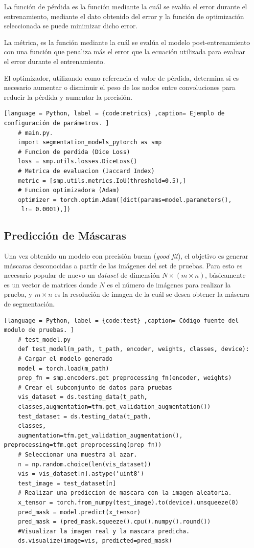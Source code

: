 La función de pérdida es la función mediante la cuál se evalúa el error durante el entrenamiento, mediante el dato obtenido del error y la función de optimización seleccionada se puede minimizar dicho error.

La métrica, es la función mediante la cuál se evalúa el modelo post-entrenamiento con una función que penaliza más el error que la ecuación utilizada para evaluar el error durante el entrenamiento.

El optimizador, utilizando como referencia el valor de pérdida, determina si es necesario aumentar o disminuir el peso de los nodos entre convoluciones para reducir la pérdida y aumentar la precisión.

\begin{lstlisting}[language = Python, label = {code:metrics} ,caption= Ejemplo de configuración de parámetros. ]
    # main.py.
    import segmentation_models_pytorch as smp
    # Funcion de perdida (Dice Loss)
    loss = smp.utils.losses.DiceLoss() 
    # Metrica de evaluacion (Jaccard Index)
    metric = [smp.utils.metrics.IoU(threshold=0.5),]
    # Funcion optimizadora (Adam)
    optimizer = torch.optim.Adam([dict(params=model.parameters(),
     lr= 0.0001),])
\end{lstlisting}

\subsection{Predicción de Máscaras} 
Una vez obtenido un modelo con precisión buena (\emph{good fit}), el objetivo es generar máscaras desconocidas a partír de las imágenes del set de pruebas. Para esto es necesario popular de nuevo un \emph{dataset} de dimensión $N \times (m \times n)$, básicamente es un vector de matrices donde $N$ es el número de imágenes para realizar la prueba, y $m \times n$ es la resolución de imagen de la cuál se desea obtener la máscara de segmentación.

\begin{lstlisting}[language = Python, label = {code:test} ,caption= Código fuente del modulo de pruebas. ]
    # test_model.py
    def test_model(m_path, t_path, encoder, weights, classes, device):
    # Cargar el modelo generado
    model = torch.load(m_path)
    prep_fn = smp.encoders.get_preprocessing_fn(encoder, weights)
    # Crear el subconjunto de datos para pruebas
    vis_dataset = ds.testing_data(t_path,
    classes,augmentation=tfm.get_validation_augmentation())
    test_dataset = ds.testing_data(t_path,
    classes, 
    augmentation=tfm.get_validation_augmentation(), preprocessing=tfm.get_preprocessing(prep_fn))
    # Seleccionar una muestra al azar.
    n = np.random.choice(len(vis_dataset))
    vis = vis_dataset[n].astype('uint8')
    test_image = test_dataset[n]
    # Realizar una prediccion de mascara con la imagen aleatoria.
    x_tensor = torch.from_numpy(test_image).to(device).unsqueeze(0)
    pred_mask = model.predict(x_tensor)
    pred_mask = (pred_mask.squeeze().cpu().numpy().round())
    #Visualizar la imagen real y la mascara predicha.
    ds.visualize(image=vis, predicted=pred_mask)
\end{lstlisting}

